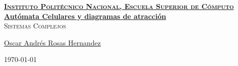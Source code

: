 \documentclass[12pt, fleqn]{report}                             %
\author{Oscar Andrés Rosas}                                     %
\theoremstyle{break}                                            %
\begin{document}
\begin{titlepage}
    
    \pagecolor{TitlePageColor}                                      %
    \color{white}                                                   %

    \vspace                                                         %
    \baselineskip                                                   %

    \makebox[0pt][l]{\rule{1.3\textwidth}{3pt}}                     %
    
    \href{https://compilandoconocimiento.com}                       %
    {\textbf{\textsc{\Huge Instituto Politécnico Nacional, Escuela Superior de Cómputo}}}\\[2.7cm]      %

    \href{\ProjectNameLink}                                         %
    {\fontsize{45}{52}\selectfont \textbf{Autómata Celulares y diagramas de atracción}}\\[0.5cm] %
    \textcolor{ColorSubtext}{\textsc{\Huge Sistemas Complejos}}     %
    
    \vfill                                                          %
    
    \href{\ProjectAuthorLink}                                       %
    {\LARGE \textsf{Oscar Andrés Rosas Hernandez}}                  %

    \vspace                                                         %
    \baselineskip                                                   %
    
    {\large \textsf{\today}}                                        %

\end{titlepage}
\end{document}
